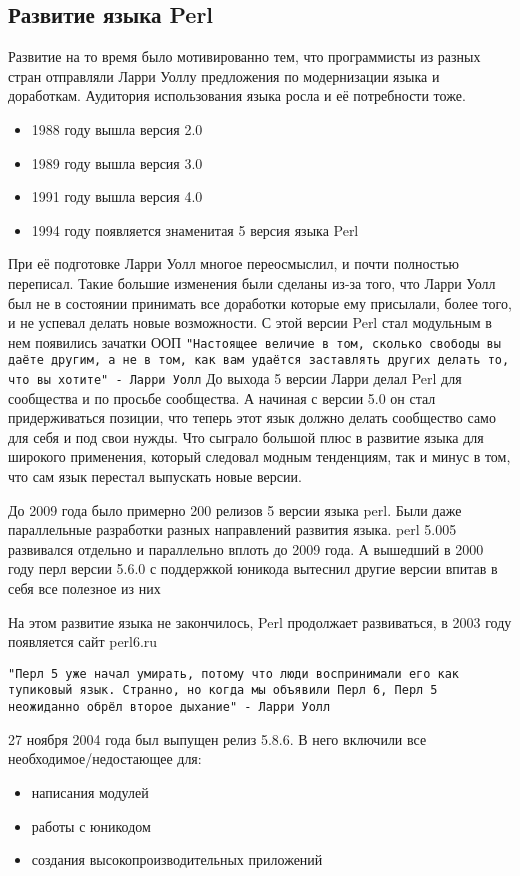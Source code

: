 \subsection{Развитие языка Perl}
Развитие на то время было мотивированно тем, что программисты из разных стран отправляли Ларри Уоллу предложения по модернизации языка и доработкам. Аудитория использования языка росла и её потребности тоже. 
\begin{itemize}
 \item 1988 году вышла версия 2.0
 \item1989 году вышла версия 3.0
 \item1991 году вышла версия 4.0
 \item1994 году появляется знаменитая 5 версия языка Perl
\end{itemize}
При её подготовке Ларри Уолл многое переосмыслил, и почти полностью переписал. Такие большие изменения были сделаны из-за того, что Ларри Уолл был не в состоянии принимать все доработки которые ему присылали, более того, и не успевал делать новые возможности. С этой версии Perl стал модульным в нем появились зачатки ООП
\verb|"Настоящее величие в том, сколько свободы вы даёте другим, а не в том, как вам удаётся заставлять других делать то, что вы хотите" - Ларри Уолл|
До выхода 5 версии Ларри делал Perl для сообщества и по просьбе сообщества. А начиная с версии 5.0 он стал придерживаться позиции, что теперь этот язык должно делать сообщество само для себя и под свои нужды. Что сыграло большой плюс в развитие языка для широкого применения, который следовал модным тенденциям, так и минус в том, что сам язык перестал выпускать новые версии.

До 2009 года было примерно 200 релизов 5 версии языка perl. Были даже параллельные разработки разных направлений развития языка. perl 5.005 развивался отдельно и параллельно вплоть до 2009 года. 
А вышедший в 2000 году перл версии 5.6.0 с поддержкой юникода вытеснил другие версии впитав в себя все полезное из них

На этом развитие языка не закончилось, Perl продолжает развиваться, в 2003 году появляется сайт perl6.ru

\verb|"Перл 5 уже начал умирать, потому что люди воспринимали его как тупиковый язык. Странно, но когда мы объявили Перл 6, Перл 5 неожиданно обрёл второе дыхание" - Ларри Уолл|

27 ноября 2004 года был выпущен релиз 5.8.6. В него включили все необходимое/недостающее для:
\begin{itemize}
 \item написания модулей
 \item работы с юникодом
 \item создания высокопроизводительных приложений
\end{itemize}

